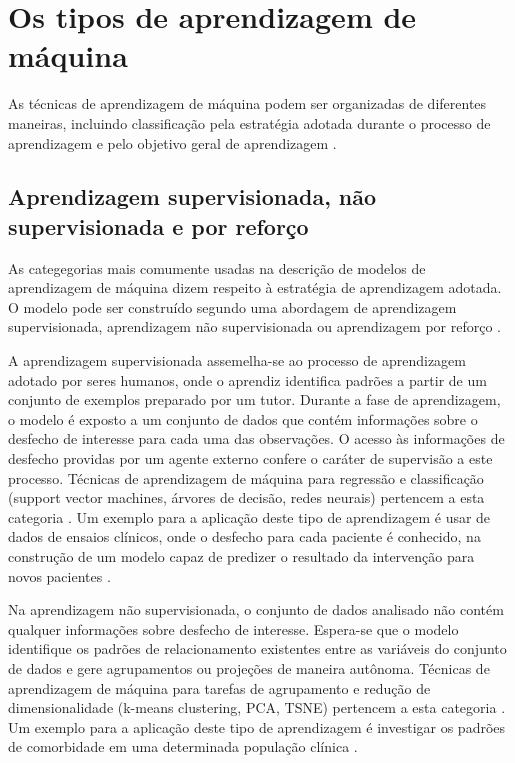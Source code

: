 \section{Os tipos de aprendizagem de máquina}
As técnicas de aprendizagem de máquina podem ser organizadas de diferentes maneiras, incluindo classificação pela estratégia adotada durante o processo
de aprendizagem e pelo objetivo geral de aprendizagem \cite{Theobald2021, Ng2001}.

\subsection{Aprendizagem supervisionada, não supervisionada e por reforço}
As categegorias mais comumente usadas na descrição de modelos de aprendizagem de máquina dizem respeito à estratégia de aprendizagem adotada. O
modelo pode ser construído segundo uma abordagem de aprendizagem supervisionada, aprendizagem não supervisionada ou aprendizagem por reforço
\cite{Theobald2021, Bi2019}.

A aprendizagem supervisionada assemelha-se ao processo de aprendizagem adotado por seres humanos, onde o aprendiz identifica padrões a partir de
um conjunto de exemplos preparado por um tutor. Durante a fase de aprendizagem, o modelo é exposto a um conjunto de dados que contém informações
sobre o desfecho de interesse para cada uma das observações. O acesso às informações de desfecho providas por um agente externo confere o caráter
de supervisão a este processo. Técnicas de aprendizagem de máquina para regressão e classificação (support vector machines, árvores de decisão,
redes neurais) pertencem a esta categoria \cite{Theobald2021, Bi2019}. Um exemplo para a aplicação deste tipo de aprendizagem é usar de dados de
ensaios clínicos, onde o desfecho para cada paciente é conhecido, na construção de um modelo capaz de predizer o resultado da intervenção para
novos pacientes \cite{Collins2023}.

Na aprendizagem não supervisionada, o conjunto de dados analisado não contém qualquer informações sobre desfecho de interesse. Espera-se que o modelo
identifique os padrões de relacionamento existentes entre as variáveis do conjunto de dados e gere agrupamentos ou projeções de maneira autônoma.
Técnicas de aprendizagem de máquina para tarefas de agrupamento e redução de dimensionalidade (k-means clustering, PCA, TSNE) pertencem a esta categoria
\cite{Theobald2021, Bi2019}. Um exemplo para a aplicação deste tipo de aprendizagem é investigar os padrões de comorbidade em uma determinada população
clínica \cite{Sanchez2019}.


